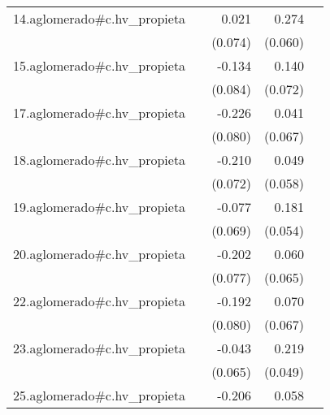 {\begin{longtable}{l*{4}{D{.}{.}{-1}}}
\addlinespace
14.aglomerado#c.hv\_propieta&                     &       0.021         &       0.274\sym{***}&                     \\
            &                     &     (0.074)         &     (0.060)         &                     \\
\addlinespace
15.aglomerado#c.hv\_propieta&                     &      -0.134         &       0.140         &                     \\
            &                     &     (0.084)         &     (0.072)         &                     \\
\addlinespace
17.aglomerado#c.hv\_propieta&                     &      -0.226\sym{**} &       0.041         &                     \\
            &                     &     (0.080)         &     (0.067)         &                     \\
\addlinespace
18.aglomerado#c.hv\_propieta&                     &      -0.210\sym{**} &       0.049         &                     \\
            &                     &     (0.072)         &     (0.058)         &                     \\
\addlinespace
19.aglomerado#c.hv\_propieta&                     &      -0.077         &       0.181\sym{***}&                     \\
            &                     &     (0.069)         &     (0.054)         &                     \\
\addlinespace
20.aglomerado#c.hv\_propieta&                     &      -0.202\sym{**} &       0.060         &                     \\
            &                     &     (0.077)         &     (0.065)         &                     \\
\addlinespace
22.aglomerado#c.hv\_propieta&                     &      -0.192\sym{*}  &       0.070         &                     \\
            &                     &     (0.080)         &     (0.067)         &                     \\
\addlinespace
23.aglomerado#c.hv\_propieta&                     &      -0.043         &       0.219\sym{***}&                     \\
            &                     &     (0.065)         &     (0.049)         &                     \\
\addlinespace
25.aglomerado#c.hv\_propieta&                     &      -0.206\sym{*}  &       0.058         &                     \\

\end{longtable}}
